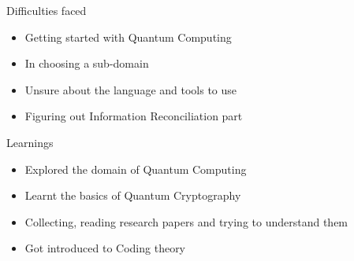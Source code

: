 \documentclass{beamer}
\begin{document}
\begin{frame}{Difficulties faced}
	\begin{itemize}
		\item Getting started with Quantum Computing
        \item In choosing a sub-domain
        \item Unsure about the language and tools to use
		\item Figuring out Information Reconciliation part
	\end{itemize}
\end{frame}


\begin{frame}{Learnings}
	\begin{itemize}
		\item Explored the domain of Quantum Computing
		\item Learnt the basics of Quantum Cryptography
		\item Collecting, reading research papers and trying to understand them
		\item Got introduced to Coding theory
	\end{itemize}
\end{frame}
\end{document}
